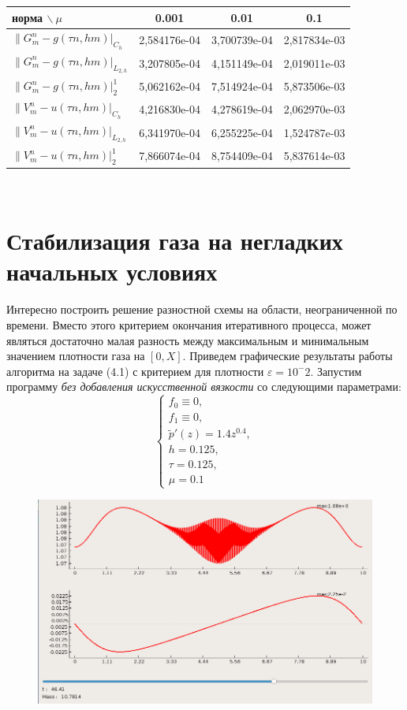 \documentclass[a4paper, 11pt]{article}
\begin{document}
\begin{tabular}{|l|c|c|c|}
\hline
норма $\backslash \ \mu$ 					& 0.001      & 0.01       & 0.1 \\
\hline
$\|G_m^n - g (\tau n, hm)|_{C_h}$ 			& 2,584176e-04 & 3,700739e-04 & 2,817834e-03 \\
\hline
$\|G_m^n - g (\tau n, hm)|_{L_{2,h}}$ 		& 3,207805e-04 & 4,151149e-04 & 2,019011e-03 \\
\hline
$\|G_m^n - g (\tau n, hm)|_2^1$ 			& 5,062162e-04 & 7,514924e-04 & 5,873506e-03 \\
\hline
$\|V_m^n - u (\tau n, hm)|_{C_h}$ 			& 4,216830e-04 & 4,278619e-04 & 2,062970e-03 \\
\hline
$\|V_m^n - u (\tau n, hm)|_{L_{2,h}}$ 		& 6,341970e-04 & 6,255225e-04 & 1,524787e-03 \\
\hline
$\|V_m^n - u (\tau n, hm)|_2^1$ 			& 7,866074e-04 & 8,754409e-04 & 5,837614e-03 \\
\hline
\end{tabular}\\

\section{Стабилизация газа на негладких начальных условиях}
Интересно построить решение разностной схемы на области, неограниченной по времени. Вместо этого критерием окончания итеративного процесса, может являться достаточно малая разность между максимальным и минимальным значением плотности газа на $[0, X]$. Приведем графические результаты работы алгоритма на задаче (4.1) с критерием для плотности $\varepsilon = 10^-2$.
Запустим программу \textit{без добавления искусственной вязкости} со следующими параметрами:
$$
\begin{cases}
 f_0 \equiv  0, \\
 f_1  \equiv 0, \\
 \tilde{p}'(z) = 1.4z^{0.4}, \\
 h = 0.125, \\
 \tau = 0.125, \\
 \mu = 0.1
\end{cases}
$$
\begin{figure}[H]
	\includegraphics[width=1\linewidth]{p3/p3_rho_t=46,41.png}
\end{figure}
\end{document}

